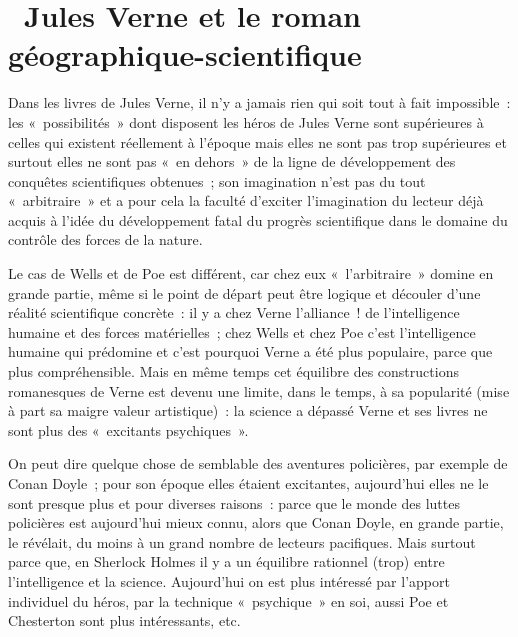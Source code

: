 \documentclass[french,twoside]{book} %
\begin{document}
\section[{ Jules Verne et le roman géographique-scientifique}]{ Jules Verne et le roman géographique-scientifique}
\noindent Dans les livres de Jules Verne, il n’y a jamais rien qui soit tout à fait impossible : les « possibilités » dont disposent les héros de Jules Verne sont supérieures à celles qui existent réellement à l’époque mais elles ne sont pas trop supérieures et surtout elles ne sont pas « en dehors » de la ligne de développement des conquêtes scientifiques obtenues ; son imagination n’est pas du tout « arbitraire » et a pour cela la faculté d’exciter l’imagination du lecteur déjà acquis à l’idée du développement fatal du progrès scientifique dans le domaine du contrôle des forces de la nature.\par
Le cas de Wells et de Poe est différent, car chez eux « l’arbitraire » domine en grande partie, même si le point de départ peut être logique et découler d’une réalité scientifique concrète : il y a chez Verne l’alliance ! de l’intelligence humaine et des forces matérielles ; chez Wells et chez Poe c’est l’intelligence humaine qui prédomine et c’est pourquoi Verne a été plus populaire, parce que plus compréhensible. Mais en même temps cet équilibre des constructions romanesques de Verne est devenu une limite, dans le temps, à sa popularité (mise à part sa maigre valeur artistique) : la science a dépassé Verne et ses livres ne sont plus des « excitants psychiques ».\par
On peut dire quelque chose de semblable des aventures policières, par exemple de Conan Doyle ; pour son époque elles étaient excitantes, aujourd’hui elles ne le sont presque plus et pour diverses raisons : parce que le monde des luttes policières est aujourd’hui mieux connu, alors que Conan Doyle, en grande partie, le révélait, du moins à un grand nombre de lecteurs pacifiques. Mais surtout parce que, en Sherlock Holmes il y a un équilibre rationnel (trop) entre l’intelligence et la science. Aujourd’hui on est plus intéressé par l’apport individuel du héros, par la technique « psychique » en soi, aussi Poe et Chesterton sont plus intéressants, etc.\par
\end{document}

